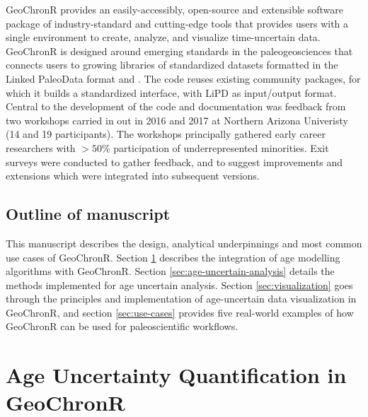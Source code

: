 \documentclass[gchron, manuscript]{copernicus}
\begin{document}
GeoChronR provides an easily-accessibly, open-source and extensible software package of industry-standard and cutting-edge tools that provides users with a single environment to create, analyze, and visualize time-uncertain data.
GeoChronR is designed around emerging standards in the paleogeosciences that connects users to growing libraries of standardized datasets formatted in the Linked PaleoData format \citep{LiPD} and \citep{neotoma}.
The code reuses existing community packages, for which it builds a standardized interface, with LiPD as input/output format.
Central to the development of the code and documentation was feedback from two workshops carried in out in 2016 and 2017 at Northern Arizona Univeristy (14 and 19 participants).
The workshops principally gathered early career researchers with \(>50\%\) participation of underrepresented minorities.
Exit surveys were conducted to gather feedback, and to suggest improvements and extensions which were integrated into subsequent versions.

\subsection{Outline of manuscript}

This manuscript describes the design, analytical underpinnings and most common use cases of GeoChronR.
Section \ref{sec:age-modeling} describes the integration of age modelling algorithms with GeoChronR.
Section \ref{sec:age-uncertain-analysis} details the methods implemented for age uncertain analysis.
Section \ref{sec:visualization} goes through the principles and implementation of age-uncertain data visualization in GeoChronR, and section \ref{sec:use-cases} provides five real-world examples of how GeoChronR can be used for paleoscientific workflows.

\hypertarget{sec:age-modeling}{%
\section{Age Uncertainty Quantification in GeoChronR}\label{sec:age-modeling}}
\end{document}
